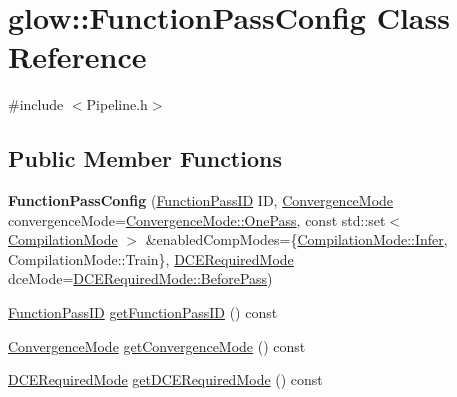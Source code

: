 \hypertarget{classglow_1_1_function_pass_config}{}\section{glow\+:\+:Function\+Pass\+Config Class Reference}
\label{classglow_1_1_function_pass_config}


{\ttfamily \#include $<$Pipeline.\+h$>$}

\subsection*{Public Member Functions}
\begin{DoxyCompactItemize}
\item 
\mbox{\label{classglow_1_1_function_pass_config_a1bd37df36d6f87e05c0a38bea7c3b6d7}} 
{\bfseries Function\+Pass\+Config} (\hyperlink{namespaceglow_a3157945b92abd634c79fa9d4724472eb}{Function\+Pass\+ID} ID, \hyperlink{namespaceglow_a56845b9c860fa69d01d2084361d7c1f0}{Convergence\+Mode} convergence\+Mode=\hyperlink{namespaceglow_a56845b9c860fa69d01d2084361d7c1f0accd4cef52fe08da3eeac0e4396a2aca2}{Convergence\+Mode\+::\+One\+Pass}, const std\+::set$<$ \hyperlink{structglow_1_1_compilation_context_a92efb87746c0edf7756b84fdcd87014a}{Compilation\+Mode} $>$ \&enabled\+Comp\+Modes=\{\hyperlink{structglow_1_1_compilation_context_a92efb87746c0edf7756b84fdcd87014aa442b0d534b230e2f2c9b562974652f79}{Compilation\+Mode\+::\+Infer}, Compilation\+Mode\+::\+Train\}, \hyperlink{namespaceglow_a6b85539f22b3e3292adf202254f0da1e}{D\+C\+E\+Required\+Mode} dce\+Mode=\hyperlink{namespaceglow_a6b85539f22b3e3292adf202254f0da1eaff7ad7af6ac42e36a5d538e74cde072d}{D\+C\+E\+Required\+Mode\+::\+Before\+Pass})
\item 
\hyperlink{namespaceglow_a3157945b92abd634c79fa9d4724472eb}{Function\+Pass\+ID} \hyperlink{classglow_1_1_function_pass_config_aca17ec5444201ab7fa0fa0aa535168a0}{get\+Function\+Pass\+ID} () const
\item 
\hyperlink{namespaceglow_a56845b9c860fa69d01d2084361d7c1f0}{Convergence\+Mode} \hyperlink{classglow_1_1_function_pass_config_a3dbd1251a57ecf108bd6157a34743e6d}{get\+Convergence\+Mode} () const
\item 
\hyperlink{namespaceglow_a6b85539f22b3e3292adf202254f0da1e}{D\+C\+E\+Required\+Mode} \hyperlink{classglow_1_1_function_pass_config_a1f6b2b49e58dc51bc1bc66246a6bb270}{get\+D\+C\+E\+Required\+Mode} () const

\end{DoxyCompactItemize}
